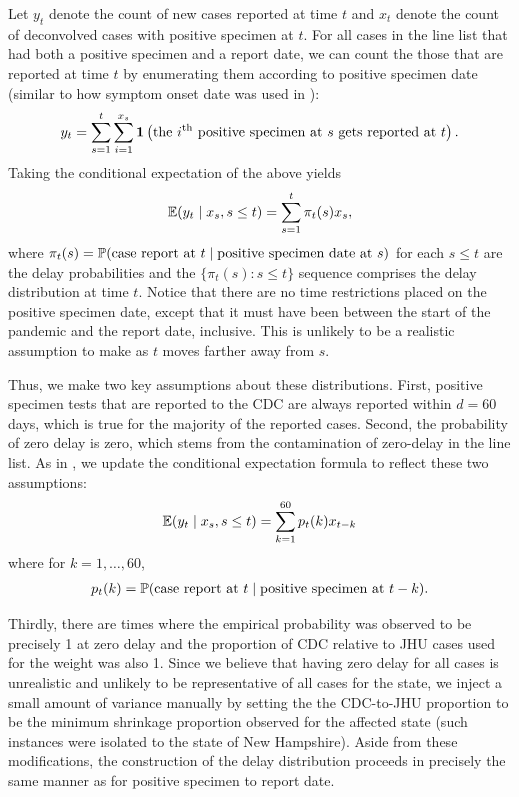 \documentclass{article}
\begin{document}
Let $y_t$ denote the count of new cases reported at time $t$ and $x_t$ denote
the count of deconvolved cases with positive specimen at $t$. For all cases in
the line list that had both a positive specimen and a report date, we can count
the those that are reported at time $t$ by enumerating them according to
positive specimen date (similar to how symptom onset date was used in
\citealp{jahja2022real}):
\begin{align*}
y_t = \sum_{s=1}^{t} \sum_{i=1}^{x_s}\indicator \left ( \text{the }i\th\text{ positive specimen at }
    s \text{ gets reported at }t \right ).
\end{align*}
Taking the conditional expectation of the above yields
\begin{align*}
\E(y_t \mid x_s, s \leq t) = \sum_{s=1}^{t} \pi_t(s) x_s ,
\end{align*}
where $\pi_t(s) = \P(\text{case report at }t \mid \text{positive specimen date
at }s)$ for each $s \leq t$ are the delay probabilities and the $\{ \pi_t(s) : s
\leq t \}$ sequence comprises the delay distribution at time $t$. Notice that
there are no time restrictions placed on the positive specimen date, except that
it must have been between the start of the pandemic and the report date,
inclusive. This is unlikely to be a realistic assumption to make as $t$ moves
farther away from $s$. 

Thus, we make two key assumptions about these distributions. First, positive
specimen tests that are reported to the CDC are always reported within $d = 60$
days, which is true for the majority of the reported cases. Second, the
probability of zero delay is zero, which stems from the contamination of
zero-delay in the line list. As in \citet{jahja2022real}, we update the
conditional expectation formula to reflect these two assumptions: 
\begin{align*}
\E(y_t \mid x_s, s \leq t) = \sum_{k=1}^{60} p_t(k) x_{t-k}
\end{align*}
where for $k = 1, \dots, 60$,
\begin{align*}
p_t(k) = \P(\text{case report at }t \mid \text{positive specimen at }t-k).
\end{align*}


Thirdly, there are times where the empirical probability
was observed to be precisely 1 at zero delay and the proportion of CDC relative
to JHU cases used for the weight was also 1. Since we believe that having zero
delay for all cases is unrealistic and unlikely to be representative of all
cases for the state, we inject a small amount of variance manually by setting
the the CDC-to-JHU proportion to be the minimum shrinkage proportion observed
for the affected state (such instances were isolated to the state of New
Hampshire). Aside from these modifications, the construction of the delay
distribution proceeds in precisely the same manner as for positive specimen to
report date. 
\end{document}
